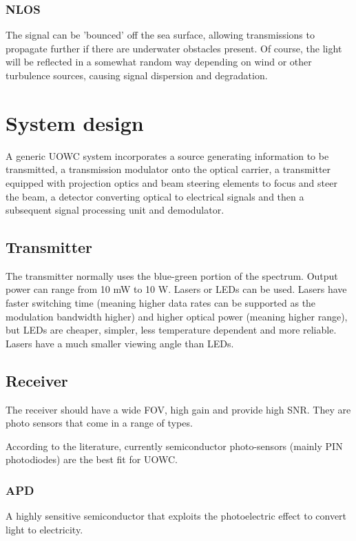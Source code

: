 \documentclass{article}
\begin{document}
\subsubsection{\ac{NLOS}}
The signal can be 'bounced' off the sea surface, allowing transmissions to propagate further if there are underwater obstacles present. Of course, the light will be reflected in a somewhat random way depending on wind or other turbulence sources, causing signal dispersion and degradation.


\section{System design}
A generic \ac{UOWC} system incorporates a source generating information to be transmitted, a transmission modulator onto the optical carrier, a transmitter equipped with projection optics and beam steering elements to focus and steer the beam, a detector converting optical to electrical signals and then a subsequent signal processing unit and demodulator.

\subsection{Transmitter}
The transmitter normally uses the blue-green portion of the spectrum. Output power can range from 10 mW to 10 W. Lasers or \ac{LED}s can be used. Lasers have faster switching time (meaning higher data rates can be supported as the modulation bandwidth higher) and higher optical power (meaning higher range), but \ac{LED}s are cheaper, simpler, less temperature dependent and more reliable. Lasers have a much smaller viewing angle than \ac{LED}s.

\subsection{Receiver}
The receiver should have a wide \ac{FOV}, high gain and provide high \ac{SNR}. They are photo sensors that come in a range of types.

According to the literature, currently semiconductor photo-sensors (mainly \ac{PIN} photodiodes) are the best fit for \ac{UOWC}.

\subsubsection{\ac{APD}}
A highly sensitive semiconductor that exploits the photoelectric effect to convert light to electricity.
\end{document}
